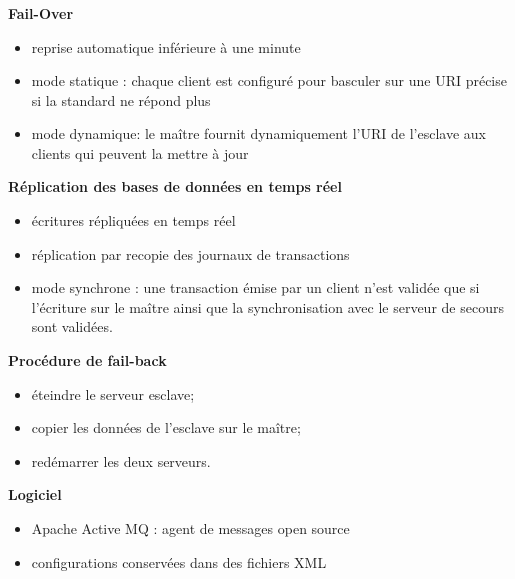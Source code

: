 \begin{frame}
\frametitle{}
\begin{block}{\textbf{Fail-Over}}
\begin{itemize}
\item reprise automatique inférieure à une minute
\item mode statique : chaque client est configuré pour basculer sur une URI précise si la standard ne répond plus
\item mode dynamique: le maître fournit dynamiquement l'URI de l'esclave aux clients qui peuvent la mettre à jour
\end{itemize}
\end{block}
\begin{block}{\textbf{Réplication des bases de données en temps réel}}
\begin{itemize}
\item écritures répliquées en temps réel
\item réplication par recopie des journaux de transactions
\item mode synchrone : une transaction émise par un client n'est validée que si l'écriture sur le maître ainsi que la synchronisation avec le serveur de secours sont validées.
\end{itemize}
\end{block}
\end{frame}

\begin{frame}
\begin{block}{\textbf{Procédure de fail-back}}
\begin{itemize}
	\item éteindre le serveur esclave;
	\item copier les données de l'esclave sur le maître;
	\item redémarrer les deux serveurs.
\end{itemize} 
\end{block}
\begin{block}{\textbf{Logiciel}}
\begin{itemize}
	\item Apache Active MQ : agent de messages open source
	\item configurations conservées dans des fichiers XML
\end{itemize} 
\end{block}
\end{frame}
